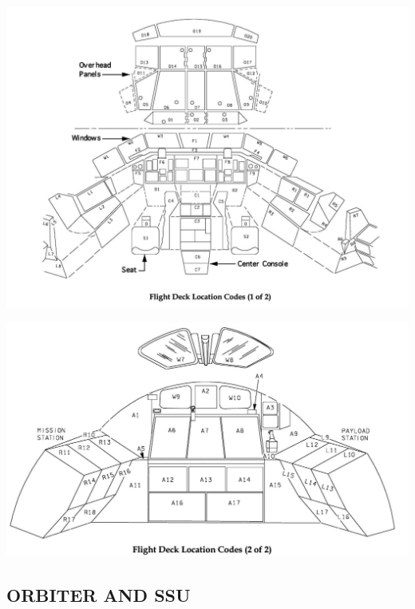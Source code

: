 \documentclass[13pt]{article}
\begin{document}
\includegraphics[width=1\textwidth]{Flight_Deck_Loc_Codes_1.jpg}

\includegraphics[width=1\textwidth]{Flight_Deck_Loc_Codes_2.jpg}

\vfill

\newpage
\subsection{\large ORBITER AND SSU}
\localtableofcontents
\end{document}
